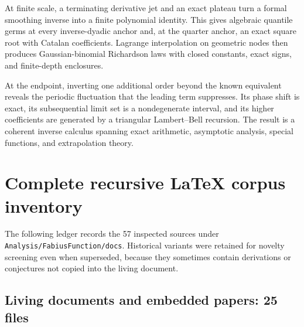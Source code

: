 \documentclass[11pt,oneside]{article}
\numberwithin{equation}{section}
\theoremstyle{definition}
\theoremstyle{remark}
\begin{document}
At finite scale, a terminating derivative jet and an exact plateau turn a formal smoothing
inverse into a finite polynomial identity.  This gives algebraic quantile germs at every
inverse-dyadic anchor and, at the quarter anchor, an exact square root with Catalan
coefficients.  Lagrange interpolation on geometric nodes then produces Gaussian-binomial
Richardson laws with closed constants, exact signs, and finite-depth enclosures.

At the endpoint, inverting one additional order beyond the known equivalent reveals the
periodic fluctuation that the leading term suppresses.  Its phase shift is exact, its
subsequential limit set is a nondegenerate interval, and its higher coefficients are generated
by a triangular Lambert--Bell recursion.  The result is a coherent inverse calculus spanning
exact arithmetic, asymptotic analysis, special functions, and extrapolation theory.

\appendix

\section{Complete recursive LaTeX corpus inventory}
\label{p1:app:inventory}

The following ledger records the 57 inspected sources under
\texttt{Analysis/FabiusFunction/docs}.  Historical variants were retained for novelty
screening even when superseded, because they sometimes contain derivations or conjectures not
copied into the living document.

\subsection{Living documents and embedded papers: 25 files}
\end{document}
